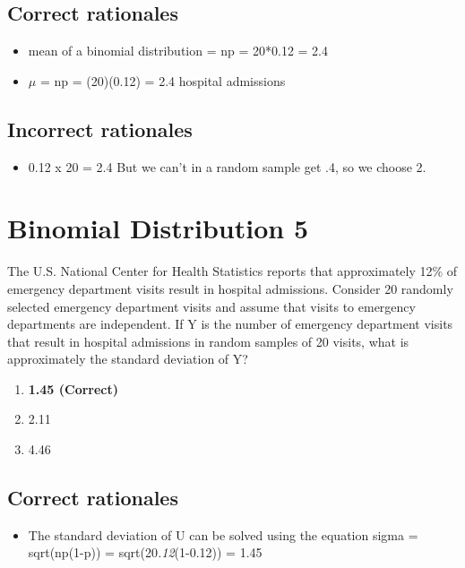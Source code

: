 \documentclass[letterpaper,9pt,twoside,printwatermark=false]{pinp}
\providecommand{\tightlist}{%
  \setlength{\itemsep}{0pt}\setlength{\parskip}{0pt}}
\begin{document}
\subsection{Correct rationales}\label{correct-rationales-3}

\begin{itemize}
\tightlist
\item
  mean of a binomial distribution = np = 20*0.12 = 2.4
\item
  \(\mu\) = np = (20)(0.12) = 2.4 hospital admissions
\end{itemize}

\subsection{Incorrect rationales}\label{incorrect-rationales-3}

\begin{itemize}
\tightlist
\item
  0.12 x 20 = 2.4 But we can't in a random sample get .4, so we choose
  2.
\end{itemize}

\section{Binomial Distribution 5}\label{binomial-distribution-5}

The U.S. National Center for Health Statistics reports that
approximately 12\% of emergency department visits result in hospital
admissions. Consider 20 randomly selected emergency department visits
and assume that visits to emergency departments are independent. If Y is
the number of emergency department visits that result in hospital
admissions in random samples of 20 visits, what is approximately the
standard deviation of Y?

\begin{enumerate}
\def\labelenumi{\alph{enumi}.}
\tightlist
\item
  \textbf{1.45 (Correct)}
\item
  2.11
\item
  4.46
\end{enumerate}

\subsection{Correct rationales}\label{correct-rationales-4}

\begin{itemize}
\tightlist
\item
  The standard deviation of U can be solved using the equation sigma =
  sqrt(np(1-p)) = sqrt(20\emph{.12}(1-0.12)) = 1.45
\end{itemize}
\end{document}
